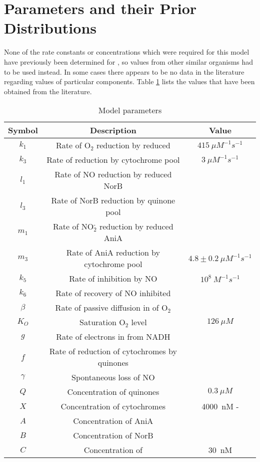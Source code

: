 
\section{Parameters and their Prior Distributions}

None of the rate constants or concentrations which were required for this model have previously been determined for \Nsm, so values from other similar organisms had to be used instead. In some cases there appears to be no data in the literature regarding values of particular components. Table \ref{tab:ps} lists the values that have been obtained from the literature.

\begin{table}[ht!]
\begin{center}
\begin{tabular}{ccc}
\toprule
\textbf{Symbol} & \textbf{Description} & \textbf{Value}\\
\midrule
$k_1$ & Rate of O$_{\textrm{2}}$ reduction by reduced \cbbthree{} & $415~\mu M^{-1} s^{-1}$ \\
$k_3$ & Rate of \cbbthree{} reduction by cytochrome pool & $3~\mu M^{-1} s^{-1}$\\ 
$l_1$ & Rate of NO reduction by reduced NorB\\
$l_3$ & Rate of NorB reduction by quinone pool\\
$m_1$ & Rate of NO$_{\textrm{2}}^{\textrm{-}}$ reduction by reduced AniA\\
$m_3$ & Rate of AniA reduction by cytochrome pool & $4.8\pm0.2~\mu M^{-1}s^{-1}$\\
$k_5$ & Rate of \cbbthree{} inhibition by NO & $10^8~M ^{-1} s ^{-1}$\\
$k_6$ & Rate of recovery of NO inhibited \cbbthree{}\\
$\beta$ & Rate of passive diffusion in of O$_{\textrm{2}}$\\
$K_O$ & Saturation O$_{\textrm{2}}$ level & $126~\mu M$\\
$g$ & Rate of electrons in from NADH\\
$f$ & Rate of reduction of cytochromes by quinones\\
$\gamma$ & Spontaneous loss of NO\\
$Q$ & Concentration of quinones & $0.3~\mu M$\\
$X$ & Concentration of cytochromes & 4000~nM - \cbbthree{}\\   
$A$ & Concentration of AniA\\
$B$ & Concentration of NorB\\
$C$ & Concentration of \cbbthree{} & 30~nM \\
\bottomrule
\end{tabular}
\caption{Model parameters
\label{tab:ps}}
\end{center}
\end{table}

